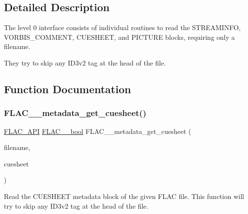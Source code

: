 \subsection{Detailed Description}
The level 0 interface consists of individual routines to read the S\+T\+R\+E\+A\+M\+I\+N\+FO, V\+O\+R\+B\+I\+S\+\_\+\+C\+O\+M\+M\+E\+NT, C\+U\+E\+S\+H\+E\+ET, and P\+I\+C\+T\+U\+RE blocks, requiring only a filename. 

They try to skip any I\+D3v2 tag at the head of the file. 

\subsection{Function Documentation}
\mbox{\label{group__flac__metadata__level0_ga6ee2633dc179c2a0cb5fef5762faf0fd}} 
\subsubsection{\texorpdfstring{F\+L\+A\+C\+\_\+\+\_\+metadata\+\_\+get\+\_\+cuesheet()}{FLAC\_\_metadata\_get\_cuesheet()}}
{\footnotesize\ttfamily \hyperlink{group__flac__export_ga56ca07df8a23310707732b1c0007d6f5}{F\+L\+A\+C\+\_\+\+A\+PI} \hyperlink{ordinals_8h_a95103469f1cbd78b8cf250194985b34e}{F\+L\+A\+C\+\_\+\+\_\+bool} F\+L\+A\+C\+\_\+\+\_\+metadata\+\_\+get\+\_\+cuesheet (\begin{DoxyParamCaption}\item[{\hyperlink{zconf_8h_a2c212835823e3c54a8ab6d95c652660e}{const} char $\ast$}]{filename,  }\item[{\hyperlink{struct_f_l_a_c_____stream_metadata}{F\+L\+A\+C\+\_\+\+\_\+\+Stream\+Metadata} $\ast$$\ast$}]{cuesheet }\end{DoxyParamCaption})}

Read the C\+U\+E\+S\+H\+E\+ET metadata block of the given F\+L\+AC file. This function will try to skip any I\+D3v2 tag at the head of the file.


